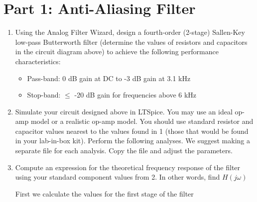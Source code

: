 \documentclass{article}
\begin{document}
\section*{Part 1: Anti-Aliasing Filter}
\begin{enumerate}
    \item Using the Analog Filter Wizard, design a fourth-order (2-stage) Sallen-Key low-pass Butterworth filter (determine the values of resistors and capacitors in the circuit diagram above) to achieve the following performance characteristics:
    \begin{itemize}
        \item Pass-band: 0 dB gain at DC to -3 dB gain at 3.1 kHz
        \item Stop-band: $\leq$ -20 dB gain for frequencies above 6 kHz
    \end{itemize}
    \item Simulate your circuit designed above in LTSpice. You may use an ideal op-amp model or a realistic op-amp model. You should use standard resistor and capacitor values nearest to the values found in 1 (those that would be found in your lab-in-box kit). Perform the following analyses. We suggest making a separate file for each analysis. Copy the file and adjust the parameters.
    \begin{center}
    \end{center}
    \item Compute an expression for the theoretical frequency response of the filter using your standard component values from 2. In other words, find $H(j\omega)$
    \begin{center}
        First we calculate the values for the first stage of the filter
    \end{center}
    \begin{equation}

\end{equation}
\end{enumerate}
\end{document}

